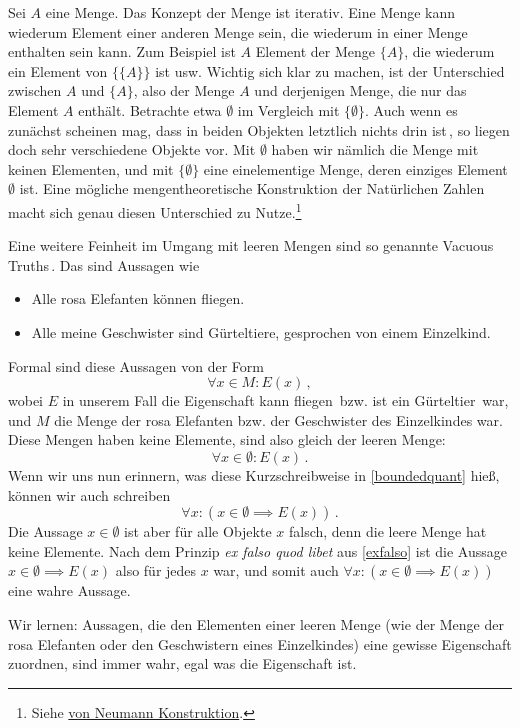 \begin{bem}
Sei $A$ eine Menge. Das Konzept der Menge ist iterativ. Eine Menge kann wiederum Element einer anderen Menge sein, die wiederum in einer Menge enthalten sein kann. Zum Beispiel ist $A$ Element der Menge $\{A\}$, die wiederum ein Element von $\{ \{A\}\}$ ist usw. Wichtig sich klar zu machen, ist der Unterschied zwischen $A$ und $\{A\}$, also der Menge $A$ und derjenigen Menge, die nur das Element $A$ enthält. Betrachte etwa $\emptyset$ im Vergleich mit $\{\emptyset\}$. Auch wenn es zunächst scheinen mag, dass in beiden Objekten letztlich \glqq nichts drin ist\grqq\,, so liegen doch sehr verschiedene Objekte vor. Mit $\emptyset$ haben wir nämlich die Menge mit keinen Elementen, und mit $\{\emptyset\}$ eine einelementige Menge, deren einziges Element $\emptyset$ ist. Eine mögliche mengentheoretische Konstruktion der Natürlichen Zahlen macht sich genau diesen Unterschied zu Nutze.\footnote{Siehe \href{https://de.wikipedia.org/wiki/Nat\%C3\%BCrliche\_Zahl\#Von\_Neumanns\_Modell\_der\_nat\%C3\%BCrlichen\_Zahlen}{von Neumann Konstruktion}.}
\end{bem}

\begin{bem}\label{vacuoustruth}
	Eine weitere Feinheit im Umgang mit leeren Mengen sind so genannte \glqq Vacuous Truths\grqq\,. Das sind Aussagen wie
		\begin{itemize}
			\item \glqq Alle rosa Elefanten können fliegen.\grqq
			\item \glqq Alle meine Geschwister sind Gürteltiere\grqq, gesprochen von einem Einzelkind.
		\end{itemize}	
	Formal sind diese Aussagen von der Form
		\[ \forall x\in M:E(x) \,, \]
	wobei $E$ in unserem Fall die Eigenschaft \glqq kann fliegen\grqq\, bzw. \glqq ist ein Gürteltier\grqq\, war, und $M$ die Menge der rosa Elefanten bzw. der Geschwister des Einzelkindes war. Diese Mengen haben keine Elemente, sind also gleich der leeren Menge:
		\[ \forall x\in \emptyset:E(x) \,. \]
	Wenn wir uns nun erinnern, was diese Kurzschreibweise in \cref{boundedquant} hieß, können wir auch schreiben
		\[ \forall x: \left(x\in \emptyset\implies E(x)\right) \,. \]
	Die Aussage $x\in\emptyset$ ist aber für alle Objekte $x$ falsch, denn die leere Menge hat keine Elemente. Nach dem Prinzip \textit{ex falso quod libet} aus \cref{exfalso} ist die Aussage $x\in \emptyset\implies E(x)$ also für jedes $x$ war, und somit auch $\forall x: \left(x\in \emptyset\implies E(x)\right)$ eine wahre Aussage.
	
	Wir lernen: Aussagen, die den Elementen einer leeren Menge (wie der Menge der rosa Elefanten oder den Geschwistern eines Einzelkindes) eine gewisse Eigenschaft zuordnen, sind immer wahr, egal was die Eigenschaft ist.
\end{bem}

